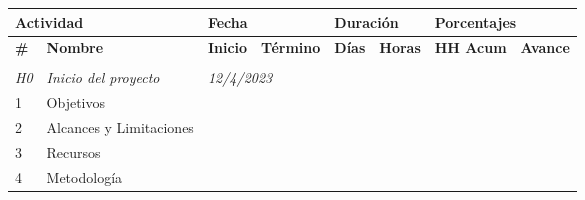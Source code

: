 \begin{longtable}[c]{@{}llllllll@{}}
	\toprule
	\multicolumn{2}{l}{\textbf{Actividad}} & \multicolumn{2}{l}{\textbf{Fecha}}                  & \multicolumn{2}{l}{\textbf{Duración}}        & \multicolumn{2}{l}{\textbf{Porcentajes}}                                                                       \\* \midrule
	\textbf{\#}                            & \textbf{Nombre}                                     & \textbf{Inicio}                              & \textbf{Término}                         & \textbf{Días} & \textbf{Horas} & \textbf{HH Acum} & \textbf{Avance} \\* \midrule
	\endhead
	\bottomrule
	\endfoot
	\endlastfoot
	\multicolumn{8}{c}{}                                                                                                                                                                                                                                         \\* \midrule
	\textit{H0}                            & \textit{Inicio del proyecto}                        & \multicolumn{2}{l}{\textit{12/4/2023}}       & \textit{}                                & \textit{}     & \textit{}      & \textit{}                          \\
	1                                      & Objetivos                                           &                                              &                                          &               &                &                  &                 \\
	2                                      & Alcances y Limitaciones                             &                                              &                                          &               &                &                  &                 \\
	3                                      & Recursos                                            &                                              &                                          &               &                &                  &                 \\
	4                                      & Metodología                                         &                                              &                                          &               &                &                  &                 \\

\end{longtable}
